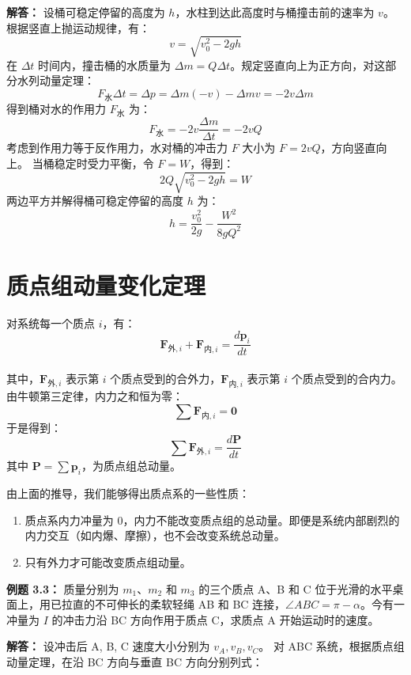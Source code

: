 \noindent\textbf{解答：}
设桶可稳定停留的高度为 $h$，水柱到达此高度时与桶撞击前的速率为 $v$。根据竖直上抛运动规律，有：
\[ v = \sqrt{v_0^2 - 2gh} \]
在 $\Delta t$ 时间内，撞击桶的水质量为 $\Delta m = Q \Delta t$。规定竖直向上为正方向，对这部分水列动量定理：
\[ F_{\text{水}} \Delta t = \Delta p = \Delta m (-v) - \Delta m v = -2v \Delta m \]
得到桶对水的作用力 $F_{\text{水}}$ 为：
\[ F_{\text{水}} = -2v \frac{\Delta m}{\Delta t} = -2vQ \]
考虑到作用力等于反作用力，水对桶的冲击力 $F$ 大小为 $F = 2vQ$，方向竖直向上。
当桶稳定时受力平衡，令 $F = W$，得到：
\[ 2Q\sqrt{v_0^2 - 2gh} = W \]
两边平方并解得桶可稳定停留的高度 $h$ 为：
\[ h = \frac{v_0^2}{2g} - \frac{W^2}{8gQ^2} \]

\newpage

\section{质点组动量变化定理}
\noindent 对系统每一个质点 $i$，有：
\[ \boldsymbol{F}_{\text{外},i} + \boldsymbol{F}_{\text{内},i} = \frac{d\boldsymbol{p}_i}{dt} \]
\\其中，$\boldsymbol{F}_{\text{外},i}$ 表示第 $i$ 个质点受到的合外力，$\boldsymbol{F}_{\text{内},i}$ 表示第 $i$ 个质点受到的合内力。
\\
\noindent 由牛顿第三定律，内力之和恒为零：
\[ \sum \boldsymbol{F}_{\text{内},i} = \boldsymbol{0} \]
于是得到：
\[ \boxed{\sum \boldsymbol{F}_{\text{外},i} = \frac{d\boldsymbol{P}}{dt}} \]
其中 $\boldsymbol{P} = \sum \boldsymbol{p}_i$，为质点组总动量。

由上面的推导，我们能够得出质点系的一些性质：
\begin{enumerate}
	\item 质点系内力冲量为 0，内力不能改变质点组的总动量。即便是系统内部剧烈的内力交互（如内爆、摩擦），也不会改变系统总动量。
	\item 只有外力才可能改变质点组动量。
\end{enumerate}

\noindent\textbf{例题 3.3：} 质量分别为 $m_1$、$m_2$ 和 $m_3$ 的三个质点 A、B 和 C 位于光滑的水平桌面上，用已拉直的不可伸长的柔软轻绳 AB 和 BC 连接，$\angle ABC = \pi - \alpha$。今有一冲量为 $I$ 的冲击力沿 BC 方向作用于质点 C，求质点 A 开始运动时的速度。

\noindent\textbf{解答：}
设冲击后 A, B, C 速度大小分别为 $v_A, v_B, v_C$。
对 ABC 系统，根据质点组动量定理，在沿 BC 方向与垂直 BC 方向分别列式：

